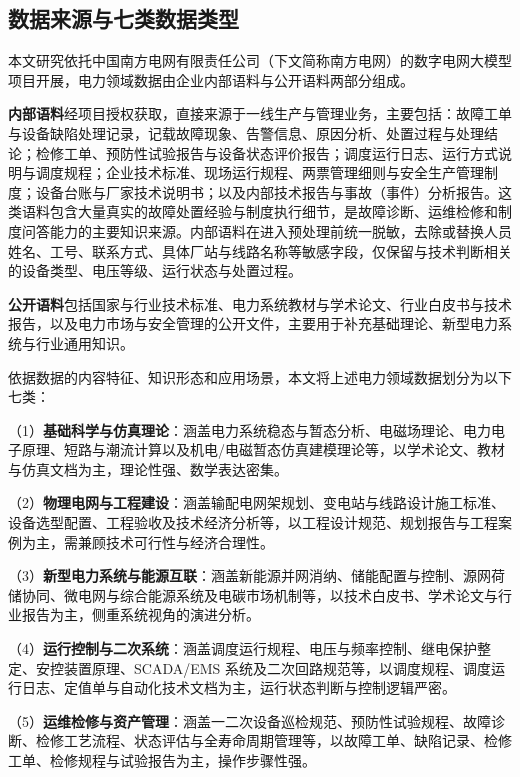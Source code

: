\documentclass[fontset=fandol,type=master,campus=shenzhen,etitleauto=true]{hithesisbook}
\begin{document}
\subsection{数据来源与七类数据类型}\label{ux6570ux636eux6765ux6e90ux4e0eux4e03ux7c7bux6570ux636eux7c7bux578b}

本文研究依托中国南方电网有限责任公司（下文简称南方电网）的数字电网大模型项目开展，电力领域数据由企业内部语料与公开语料两部分组成。

\textbf{内部语料}经项目授权获取，直接来源于一线生产与管理业务，主要包括：故障工单与设备缺陷处理记录，记载故障现象、告警信息、原因分析、处置过程与处理结论；检修工单、预防性试验报告与设备状态评价报告；调度运行日志、运行方式说明与调度规程；企业技术标准、现场运行规程、两票管理细则与安全生产管理制度；设备台账与厂家技术说明书；以及内部技术报告与事故（事件）分析报告。这类语料包含大量真实的故障处置经验与制度执行细节，是故障诊断、运维检修和制度问答能力的主要知识来源。内部语料在进入预处理前统一脱敏，去除或替换人员姓名、工号、联系方式、具体厂站与线路名称等敏感字段，仅保留与技术判断相关的设备类型、电压等级、运行状态与处置过程。

\textbf{公开语料}包括国家与行业技术标准、电力系统教材与学术论文、行业白皮书与技术报告，以及电力市场与安全管理的公开文件，主要用于补充基础理论、新型电力系统与行业通用知识。

依据数据的内容特征、知识形态和应用场景，本文将上述电力领域数据划分为以下七类：

\noindent （1）\textbf{基础科学与仿真理论}：涵盖电力系统稳态与暂态分析、电磁场理论、电力电子原理、短路与潮流计算以及机电/电磁暂态仿真建模理论等，以学术论文、教材与仿真文档为主，理论性强、数学表达密集。

\noindent （2）\textbf{物理电网与工程建设}：涵盖输配电网架规划、变电站与线路设计施工标准、设备选型配置、工程验收及技术经济分析等，以工程设计规范、规划报告与工程案例为主，需兼顾技术可行性与经济合理性。

\noindent （3）\textbf{新型电力系统与能源互联}：涵盖新能源并网消纳、储能配置与控制、源网荷储协同、微电网与综合能源系统及电碳市场机制等，以技术白皮书、学术论文与行业报告为主，侧重系统视角的演进分析。

\noindent （4）\textbf{运行控制与二次系统}：涵盖调度运行规程、电压与频率控制、继电保护整定、安控装置原理、SCADA/EMS 系统及二次回路规范等，以调度规程、调度运行日志、定值单与自动化技术文档为主，运行状态判断与控制逻辑严密。

\noindent （5）\textbf{运维检修与资产管理}：涵盖一二次设备巡检规范、预防性试验规程、故障诊断、检修工艺流程、状态评估与全寿命周期管理等，以故障工单、缺陷记录、检修工单、检修规程与试验报告为主，操作步骤性强。
\end{document}
